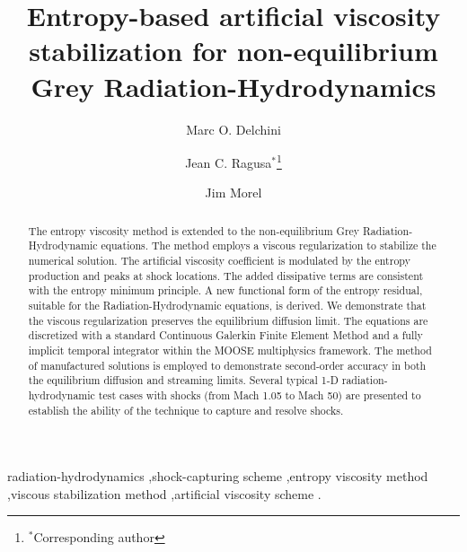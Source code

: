 \documentclass[review]{elsarticle}
\begin{document}
%
\begin{frontmatter}
%
\title{Entropy-based artificial viscosity stabilization for non-equilibrium Grey Radiation-Hydrodynamics}
\author{Marc O. Delchini}
%
\author{Jean C. Ragusa$^*$\footnote{$^*$Corresponding author}}
%
\author{Jim Morel}

\address[label1]{Department of Nuclear Engineering, Texas A\&M University, College Station, TX 77843, USA }

\begin{abstract}
The entropy viscosity method is extended to the non-equilibrium Grey Radiation-Hydrodynamic equations. 
The method employs a viscous regularization to stabilize the numerical solution. The artificial viscosity coefficient is modulated by the entropy production and peaks at shock locations. The added dissipative terms are consistent with the entropy minimum principle.  A new functional form of the entropy residual, suitable for the Radiation-Hydrodynamic equations, is derived. We demonstrate that the viscous regularization preserves the equilibrium diffusion limit. The equations are discretized with a standard Continuous Galerkin Finite Element Method and a fully implicit temporal integrator within the MOOSE multiphysics framework. The method of manufactured solutions is employed to demonstrate second-order accuracy in both the equilibrium diffusion and streaming limits. Several typical 1-D radiation-hydrodynamic test cases with shocks (from Mach 1.05 to Mach 50) are presented to establish the ability of the technique to capture and resolve shocks. 
\end{abstract}
%
\begin{keyword}
radiation-hydrodynamics \sep shock-capturing scheme \sep entropy viscosity method \sep viscous stabilization method \sep artificial viscosity scheme .
\end{keyword}
%
\end{frontmatter}
%
\linenumbers
%
\end{document}
